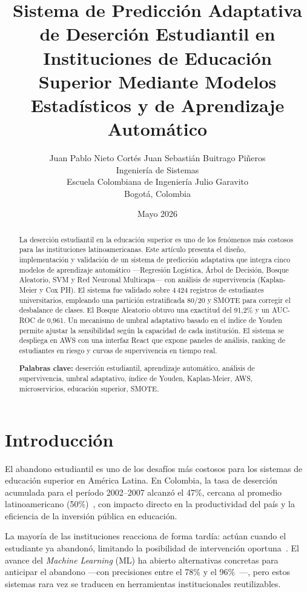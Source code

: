 \documentclass[12pt]{article}
\title{\textbf{Sistema de Predicción Adaptativa de Deserción Estudiantil
en Instituciones de Educación Superior Mediante Modelos
Estadísticos y de Aprendizaje Automático}}
\author{
    Juan Pablo Nieto Cortés \quad Juan Sebastián Buitrago Piñeros \\[4pt]
    Ingeniería de Sistemas \\
    Escuela Colombiana de Ingeniería Julio Garavito \\
    Bogotá, Colombia \\[4pt]
}
\date{Mayo 2026}
\begin{document}
\maketitle

\begin{abstract}
\noindent
La deserción estudiantil en la educación superior es uno de los fenómenos más costosos
para las instituciones latinoamericanas. Este artículo presenta el diseño, implementación
y validación de un sistema de predicción adaptativa que integra cinco modelos de
aprendizaje automático —Regresión Logística, Árbol de Decisión, Bosque Aleatorio, SVM y
Red Neuronal Multicapa— con análisis de supervivencia (Kaplan-Meier y Cox PH). El sistema
fue validado sobre 4\,424 registros de estudiantes universitarios, empleando una partición
estratificada 80/20 y SMOTE para corregir el desbalance de clases. El Bosque Aleatorio
obtuvo una exactitud del 91,2\% y un AUC-ROC de 0,961. Un mecanismo de umbral adaptativo
basado en el índice de Youden permite ajustar la sensibilidad según la capacidad de cada
institución. El sistema se despliega en AWS con una interfaz React que expone paneles de
análisis, ranking de estudiantes en riesgo y curvas de supervivencia en tiempo real.

\vspace{4pt}
\noindent\textbf{Palabras clave:} deserción estudiantil, aprendizaje automático,
análisis de supervivencia, umbral adaptativo, índice de Youden, Kaplan-Meier, AWS,
microservicios, educación superior, SMOTE.
\end{abstract}

\section{Introducción}

El abandono estudiantil es uno de los desafíos más costosos para los sistemas de
educación superior en América Latina. En Colombia, la tasa de deserción acumulada para
el período 2002--2007 alcanzó el 47\%, cercana al promedio latinoamericano
(50\%)~\cite{men2008}, con impacto directo en la productividad del país y la eficiencia
de la inversión pública en educación.

La mayoría de las instituciones reacciona de forma tardía: actúan cuando el estudiante
ya abandonó, limitando la posibilidad de intervención oportuna~\cite{men2008,perez2020}.
El avance del \textit{Machine Learning} (ML) ha abierto alternativas concretas para
anticipar el abandono —con precisiones entre el 78\% y el 96\%~\cite{perez2020,brinez2025,dasi2022}—,
pero estos sistemas rara vez se traducen en herramientas institucionales reutilizables.
\end{document}
